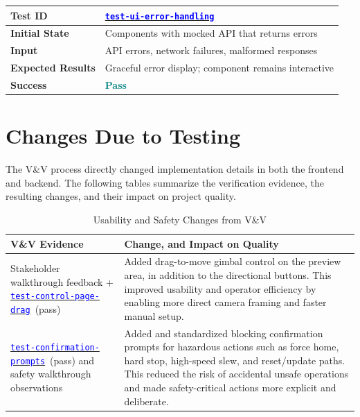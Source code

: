 \documentclass[12pt, titlepage]{article}
\newcommand{\tid}[1]{\hyperlink{tid:#1}{\textcolor{blue}{\texttt{#1}}}}
\newcommand{\tControlPageDrag}{\tid{test-control-page-drag}}
\newcommand{\tConfirmationPrompts}{\tid{test-confirmation-prompts}}
\begin{document}
\begin{tabularx}{\linewidth}{|>{\raggedright\arraybackslash}p{4cm}|>{\raggedright\arraybackslash}X|}
  \hline \textbf{Test ID}          & \tid{test-ui-error-handling}                          \\
  \hline \textbf{Initial State}    & Components with mocked API that returns errors        \\
  \hline \textbf{Input}            & API errors, network failures, malformed responses     \\
  \hline \textbf{Expected Results} & Graceful error display; component remains interactive \\
  \hline \textbf{Success}          & \textbf{\textcolor{teal}{Pass}}                       \\
  \hline
\end{tabularx}

\section{Changes Due to Testing}

The V\&V process directly changed implementation details in both the frontend
and backend. The following tables summarize the verification evidence, the
resulting changes, and their impact on project quality.

\begin{table}[H]
  \centering
  \caption{Usability and Safety Changes from V\&V}
  \label{TblChangesDueToTestingA}
  \begin{tabularx}{\textwidth}{|>{\raggedright\arraybackslash}p{5cm}|X|}
    \hline
    \textbf{V\&V Evidence}                                            & \textbf{Change, and Impact on Quality} \\
    \hline
    Stakeholder walkthrough feedback + \tControlPageDrag\ (pass)      &
    Added drag-to-move gimbal control on the preview area, in addition to the
    directional buttons. This improved usability and operator efficiency by
    enabling more direct camera framing and faster manual setup.                                               \\
    \hline
    \tConfirmationPrompts\ (pass) and safety walkthrough observations &
    Added and standardized blocking confirmation prompts for hazardous actions
    such as force home, hard stop, high-speed slew, and reset/update paths.
    This reduced the risk of accidental unsafe operations and made
    safety-critical actions more explicit and deliberate.                                                      \\
    \hline
  \end{tabularx}
\end{table}
\end{document}
